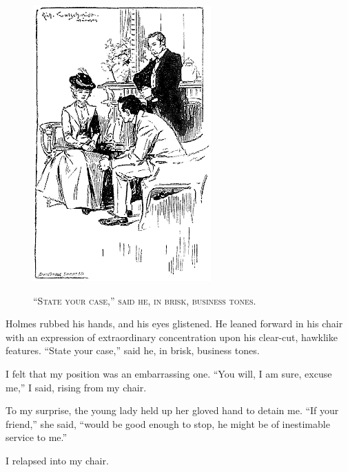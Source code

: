 \documentclass[12pt,english,oneside]{book}
\newcommand{\noun}[1]{\textsc{#1}}
\begin{document}
%
\begin{figure}[htbp]
\noindent \begin{center}\includegraphics{images/sign410-sign-03.png}\end{center}

\noindent \begin{center}\noun{{}``State your case,'' said he,
in brisk, business tones.}\end{center}
\end{figure}
Holmes rubbed his hands, and his eyes glistened. He leaned forward
in his chair with an expression of extraordinary concentration upon
his clear-cut, hawklike features. {}``State your case,'' said he,
in brisk, business tones.

I felt that my position was an embarrassing one. {}``You will, I
am sure, excuse me,'' I said, rising from my chair.

To my surprise, the young lady held up her gloved hand to detain me.
{}``If your friend,'' she said, {}``would be good enough to stop,
he might be of inestimable service to me.''

I relapsed into my chair.
\end{document}
